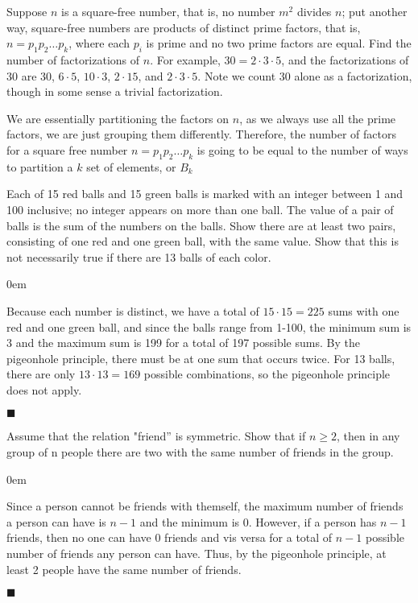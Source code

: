 \documentclass[12pt]{article}
\renewcommand{\qed}{\hfill$\blacksquare$}
\renewenvironment{proof}{\vspace{1em}\begin{addmargin}[2em]{0em}\begin{newproof}}{\end{newproof}\end{addmargin}\qed}
\newenvironment{exercise}[2][Exercise]{\begin{trivlist}
\item[\hskip \labelsep {\bfseries #1} \hskip \labelsep {\bfseries #2}]}{\end{trivlist}}
\begin{document}
\begin{exercise}{1.4.2. (2pt)}
	 Suppose $n$ is a square-free number, that is, no number $m^2$ divides $n$; put another way, square-free numbers are products of distinct prime factors, that is, $n=p_1p_2\ldots p_k$, where each $p_i$ is prime and no two prime factors are equal. Find the number of factorizations of $n$. For example, $30=2\cdot3\cdot5$, and the factorizations of 30 are 30, $6\cdot5$, $10\cdot3$, $2\cdot15$, and $2\cdot3\cdot5$. Note we count 30 alone as a factorization, though in some sense a trivial factorization. 
\end{exercise}	
We are essentially partitioning the factors on $n$, as we always use all the prime factors, we are just grouping them differently. Therefore, the number of factors for a square free number $n = p_1p_2 \ldots p_k$ is going to be equal to the number of ways to partition a $k$ set of elements, or $B_k$
\begin{exercise}{1.6.3. (2pt)}
	Each of 15 red balls and 15 green balls is marked with an integer between 1 and 100 inclusive; no integer appears on more than one ball. The value of a pair of balls is the sum of the numbers on the balls. Show there are at least two pairs, consisting of one red and one green ball, with the same value. Show that this is not necessarily true if there are 13 balls of each color. 
\end{exercise}
\begin{proof}
	Because each number is distinct, we have a total of $15 \cdot 15 = 225$ sums with one red and one green ball, and since the balls range from 1-100, the minimum sum is 3 and the maximum sum is 199 for a total of 197 possible sums. By the pigeonhole principle, there must be at one sum that occurs twice. For 13 balls, there are only $13 \cdot 13 = 169$ possible combinations, so the pigeonhole principle does not apply. 
\end{proof}
\begin{exercise} {1.6.1. (1pt)}
	Assume that the relation "friend'' is symmetric. Show that if $n \ge 2$, then in any group of n people there are two with the same number of friends in the group. 
\end{exercise}
\begin{proof}
	Since a person cannot be friends with themself, the maximum number of friends a person can have is $n - 1$ and the minimum is 0. However, if a person has $n - 1$ friends, then no one can have 0 friends and vis versa for a total of $n - 1$ possible number of friends any person can have. Thus, by the pigeonhole principle, at least 2 people have the same number of friends.
\end{proof}
\end{document}
